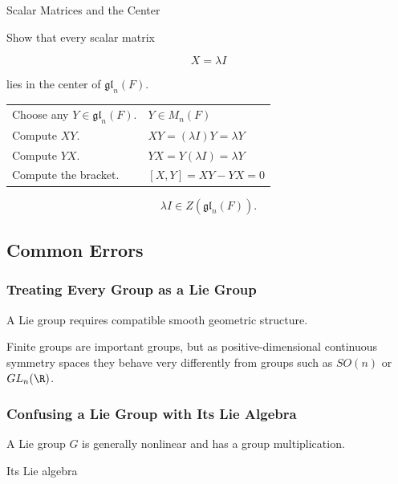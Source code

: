 \begin{workedexamplebox}{Scalar Matrices and the Center}

Show that every scalar matrix

\[ X=\lambda I \]

lies in the center of \(\mathfrak{gl}_n(F)\).

\begin{tabularx}{\textwidth}{@{}>{\raggedright\arraybackslash}p{}X@{}}
Choose any \(Y\in\mathfrak{gl}_n(F)\). & \(Y\in M_n(F)\)\\
Compute \(XY\). & \(XY=(\lambda I)Y=\lambda Y\)\\
Compute \(YX\). & \(YX=Y(\lambda I)=\lambda Y\)\\
Compute the bracket. & \([X,Y]=XY-YX=0\)
\end{tabularx}

\begin{answerbox}
\[ \boxed{\lambda I\in Z(\mathfrak{gl}_n(F)).} \]
\end{answerbox}
\end{workedexamplebox}

\subsection{Common Errors}
\label{subsec:lie-theory-common-errors}

\subsubsection{Treating Every Group as a Lie Group}

A Lie group requires compatible smooth geometric structure.

Finite groups are important groups, but as positive-dimensional continuous
symmetry spaces they behave very differently from groups such as \(SO(n)\)
or \(GL_n(\R)\).

\subsubsection{Confusing a Lie Group with Its Lie Algebra}

A Lie group \(G\) is generally nonlinear and has a group multiplication.

Its Lie algebra

